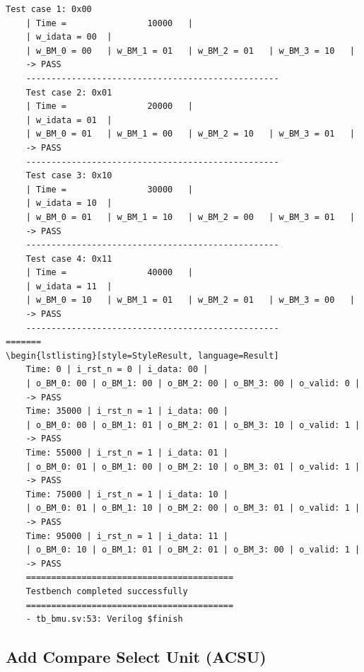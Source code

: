\begin{lstlisting}[style=StyleResult, language=Result, caption={The Result of testing BMU}]
	Test case 1: 0x00
	| Time =                10000 	|
	| w_idata = 00 	|
	| w_BM_0 = 00 	| w_BM_1 = 01 	| w_BM_2 = 01 	| w_BM_3 = 10 	|
	-> PASS
	--------------------------------------------------
	Test case 2: 0x01
	| Time =                20000 	|
	| w_idata = 01 	|
	| w_BM_0 = 01 	| w_BM_1 = 00 	| w_BM_2 = 10 	| w_BM_3 = 01 	|
	-> PASS
	--------------------------------------------------
	Test case 3: 0x10
	| Time =                30000 	|
	| w_idata = 10 	|
	| w_BM_0 = 01 	| w_BM_1 = 10 	| w_BM_2 = 00 	| w_BM_3 = 01 	|
	-> PASS
	--------------------------------------------------
	Test case 4: 0x11
	| Time =                40000 	|
	| w_idata = 11 	|
	| w_BM_0 = 10 	| w_BM_1 = 01 	| w_BM_2 = 01 	| w_BM_3 = 00 	|
	-> PASS
	--------------------------------------------------
=======
\begin{lstlisting}[style=StyleResult, language=Result]
	Time: 0 | i_rst_n = 0 | i_data: 00 |
	| o_BM_0: 00 | o_BM_1: 00 | o_BM_2: 00 | o_BM_3: 00 | o_valid: 0 |
	-> PASS
	Time: 35000 | i_rst_n = 1 | i_data: 00 |
	| o_BM_0: 00 | o_BM_1: 01 | o_BM_2: 01 | o_BM_3: 10 | o_valid: 1 |
	-> PASS
	Time: 55000 | i_rst_n = 1 | i_data: 01 |
	| o_BM_0: 01 | o_BM_1: 00 | o_BM_2: 10 | o_BM_3: 01 | o_valid: 1 |
	-> PASS
	Time: 75000 | i_rst_n = 1 | i_data: 10 |
	| o_BM_0: 01 | o_BM_1: 10 | o_BM_2: 00 | o_BM_3: 01 | o_valid: 1 |
	-> PASS
	Time: 95000 | i_rst_n = 1 | i_data: 11 |
	| o_BM_0: 10 | o_BM_1: 01 | o_BM_2: 01 | o_BM_3: 00 | o_valid: 1 |
	-> PASS
	=========================================
	Testbench completed successfully
	=========================================
	- tb_bmu.sv:53: Verilog $finish
\end{lstlisting}

\subsection{Add Compare Select Unit (ACSU)}

